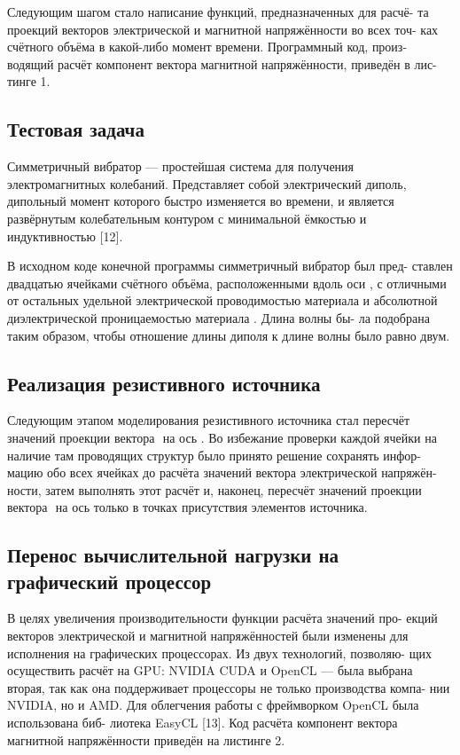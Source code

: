 Следующим шагом стало написание функций, предназначенных для расчё-
та проекций векторов электрической и магнитной напряжённости во всех точ-
ках счётного объёма в какой-либо момент времени. Программный код, произ-
водящий расчёт компонент вектора магнитной напряжённости, приведён в лис-
тинге 1.

\subsection{Тестовая задача}

Симметричный вибратор --- простейшая система для получения электромагнитных колебаний. Представляет собой электрический диполь, дипольный момент которого быстро изменяется во времени, и является развёрнутым колебательным контуром с минимальной ёмкостью и индуктивностью [12].

В исходном коде конечной программы симметричный вибратор был пред-
ставлен двадцатью ячейками счётного объёма, расположенными вдоль оси , с
отличными от остальных удельной электрической проводимостью материала
и абсолютной диэлектрической проницаемостью материала . Длина волны бы-
ла подобрана таким образом, чтобы отношение длины диполя к длине волны
было равно двум.

\subsection{Реализация резистивного источника}

Следующим этапом моделирования резистивного источника стал пересчёт
значений проекции вектора ⃗ на ось . Во избежание проверки каждой ячейки
на наличие там проводящих структур было принято решение сохранять инфор-
мацию обо всех ячейках до расчёта значений вектора электрической напряжён-
ности, затем выполнять этот расчёт и, наконец, пересчёт значений проекции
вектора ⃗ на ось
только в точках присутствия элементов источника.

\subsection{Перенос вычислительной нагрузки на графический процессор}

В целях увеличения производительности функции расчёта значений про-
екций векторов электрической и магнитной напряжённостей были изменены
для исполнения на графических процессорах. Из двух технологий, позволяю-
щих осуществить расчёт на GPU: NVIDIA CUDA и OpenCL — была выбрана
вторая, так как она поддерживает процессоры не только производства компа-
нии NVIDIA, но и AMD.
Для облегчения работы с фреймворком OpenCL была использована биб-
лиотека EasyCL [13]. Код расчёта компонент вектора магнитной напряжённости
приведён на листинге 2.

\clearpage